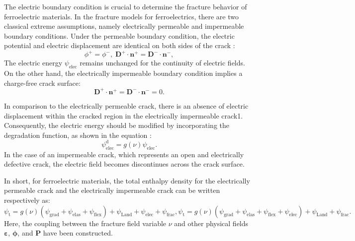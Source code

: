 \documentclass[final,times,fleqn,11pt]{elsarticle}
\begin{document}
The electric boundary condition is crucial to determine the fracture behavior of ferroelectric materials. In the fracture models for ferroelectrics, there are two classical extreme assumptions, namely electrically permeable and impermeable boundary conditions. Under the permeable boundary condition, the electric potential and electric displacement are identical on both sides of the crack \cite{parton_fracture_1976}:
\begin{equation}
    \phi^+=\phi^-,\; \mathbf{D}^+\cdot\mathbf{n}^+=\mathbf{D}^-\cdot\mathbf{n}^-,
\end{equation}
The electric energy $\psi_{\mathrm{elec}}$ remains unchanged for the continuity of electric fields. On the other hand, the electrically impermeable boundary condition implies a charge-free crack surface:
\begin{equation}
    \mathbf{D}^+\cdot\mathbf{n}^+=\mathbf{D}^-\cdot\mathbf{n}^-=0.
\end{equation}

In comparison to the electrically permeable crack, there is an absence of electric displacement within the cracked region in the electrically impermeable crack1. Consequently, the electric energy should be modified by  incorporating the degradation function, as shown in the equation \cite{wang_effect_2010}:
\begin{equation}
    \psi_{\mathrm{elec}}^\mathrm{d}=g(\nu)\psi_{\mathrm{elec}}.
\end{equation}
In the case of an impermeable crack, which represents an open and electrically defective crack, the electric field becomes discontinues across the crack surface.

In short, for ferroelectric materials, the total enthalpy density for the electrically permeable crack and the electrically impermeable crack can be written respectively as:
\begin{subequations}
    \begin{equation}
        \psi_\mathrm{t}=g(\nu)\left( \psi_\mathrm{grad}+\psi_\mathrm{elas}+\psi_\mathrm{flex} \right)+\psi_\mathrm{Land}+\psi_\mathrm{elec}+\psi_\mathrm{frac},
    \end{equation}
    \begin{equation}
        \psi_\mathrm{t}=g(\nu)\left( \psi_\mathrm{grad}+\psi_\mathrm{elas}+\psi_\mathrm{flex}+\psi_\mathrm{elec} \right)+\psi_\mathrm{Land}+\psi_\mathrm{frac}.
    \end{equation}
\end{subequations}
Here, the coupling between the fracture field variable $\nu$ and other physical fields $\mathbf{\varepsilon}$, $\mathbf{\phi}$, and $\mathbf{P}$ have been constructed. 
\end{document}
